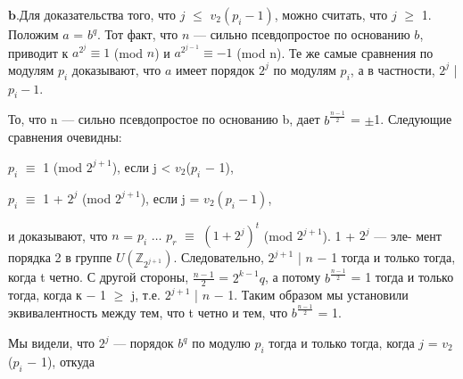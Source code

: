 \vspace{2pt}$\mathbf{b.}$Для доказательства того, что $j$ $\leqslant$ $v_{2}(p_{i} - 1)$, можно считать, \linebreak
что $j$ $\geqslant$ 1. Положим $a$ = $b^{q}$. Тот факт, что $n$ --- сильно псевдопростое \linebreak
по основанию $b$, приводит к $a^{2^{j}} \equiv 1$ (mod $n$) и $a^{2^{j - 1}} \equiv -1$ (mod n). Те \linebreak
же самые сравнения по модулям $p_{i}$ доказывают, что $a$ имеет порядок \linebreak
$2^{j}$ по модулям $p_{i}$, а в частности, $2^{j}$ | $p_{i} -1$. \ 

\vspace{1pt}То, что n --- сильно псевдопростое по основанию b, дает $b^{\frac{n-1}{2}}$ = $\pm$1. \linebreak
Следующие сравнения очевидны:

\begin{center}
$p_{i}$ $\equiv$ 1 (mod $2^{j+1}$), если j  < $v_{2}$($p_{i}$ $-$ 1), \ 

\vspace{3pt}$p_{i}$ $\equiv$ 1 + $2^{j}$ (mod $2^{j+1}$), если j  = $v_{2}(p_{i} - 1)$,
\end{center}
\noindent и доказывают, что $n$ = $p_{i}$ $\dots$ $p_{r}$ $\equiv$ $(1 + 2^{j})^{t}$ (mod $2^{j+1}$). 1 + $2^{j}$ --- эле­- \linebreak
мент порядка 2 в группе $U(\mathbb Z_{2^{j+1}})$. Следовательно, $2^{j+1}$ | $n$ $-$ 1 тогда и\linebreak
только тогда, когда t четно. С другой стороны, $\frac{n-1}{2}$ = $2^{k-1}q$, а потому\linebreak
$b^{\frac{n-1}{2}}$ = 1 тогда и только тогда, когда к $-$ 1 $\geqslant$ j,  т.е. $2^{j+1}$ | $n$ $-$ 1. Таким\linebreak
образом мы установили эквивалентность между тем, что t четно и тем,\linebreak
что $b^{\frac{n-1}{2}}$ = 1. \newline

\newpage


Мы видели, что $2^{j}$ --- порядок $b^{q}$ по модулю $p_{i}$ тогда и только тогда, \linebreak
когда $j$ = $v_{2}$($p_{i}$ $-$ 1), откуда

